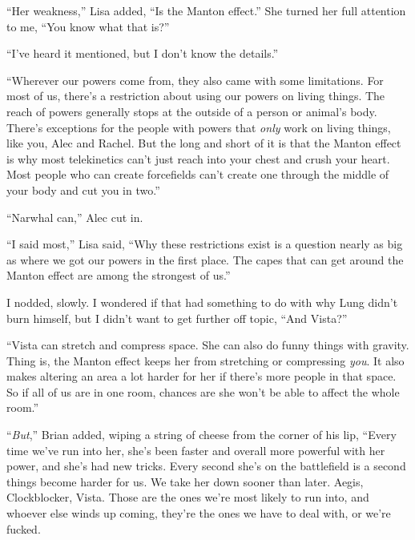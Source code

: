 ``Her weakness,'' Lisa added, ``Is the Manton effect.''  She turned her full attention to me, ``You know what that is?''



``I've heard it mentioned, but I don't know the details.''



``Wherever our powers come from, they also came with some limitations.  For most of us, there's a restriction about using our powers on living things.  The reach of powers generally stops at the outside of a person or animal's body.  There's exceptions for the people with powers that \emph{only} work on living things, like you, Alec and Rachel.  But the long and short of it is that the Manton effect is why most telekinetics can't just reach into your chest and crush your heart.  Most people who can create forcefields can't create one through the middle of your body and cut you in two.''



``Narwhal can,'' Alec cut in.



``I said most,'' Lisa said, ``Why these restrictions exist is a question nearly as big as where we got our powers in the first place.  The capes that can get around the Manton effect are among the strongest of us.''



I nodded, slowly.  I wondered if that had something to do with why Lung didn't burn himself, but I didn't want to get further off topic, ``And Vista?''



``Vista can stretch and compress space.  She can also do funny things with gravity.  Thing is, the Manton effect keeps her from stretching or compressing \emph{you}.  It also makes altering an area a lot harder for her if there's more people in that space.  So if all of us are in one room, chances are she won't be able to affect the whole room.''



``\emph{But},'' Brian added, wiping a string of cheese from the corner of his lip, ``Every time we've run into her, she's been faster and overall more powerful with her power, and she's had new tricks.  Every second she's on the battlefield is a second things become harder for us.  We take her down sooner than later.  Aegis, Clockblocker, Vista.  Those are the ones we're most likely to run into, and whoever else winds up coming, they're the ones we have to deal with, or we're fucked.



